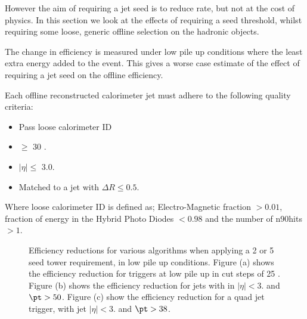 However the aim of requiring a jet seed is to reduce rate, but not at the cost 
of physics. In this section we look at the effects of requiring a seed 
threshold, whilst requiring some loose, generic offline selection on the 
hadronic objects.

The change in efficiency is measured under low pile up conditions where the 
least extra energy added to the event. This gives a worse case estimate of the 
effect of requiring a jet seed on the offline efficiency.

Each offline reconstructed calorimeter jet must adhere to the following quality 
criteria:
\begin{itemize}
\item Pass loose calorimeter ID 
\item \PT $\geq$ 30 \GeV.
\item $|\eta| \leq$ 3.0.
\item Matched to a \Lone jet with $\Delta R \leq 0.5$.
\end{itemize}
Where loose calorimeter ID is defined as; Electro-Magnetic fraction $> 0.01$, 
fraction of energy in the Hybrid Photo Diodes $< 
0.98$ and the number of n90hits $> 1$.

\begin{figure}[h!]
    \centering
     \newline
    \caption{Efficiency reductions for various \Lone algorithms when applying a 
    2 or 5 \GeV seed tower requirement, in low pile up 
    conditions. Figure (a) shows the efficiency reduction for \HT triggers at 
    low pile up in cut steps of 25 \GeV. Figure (b) 
    shows the efficiency reduction for jets with in $|\eta| <3.$ and $\pt > 
    50$\GeV. Figure (c) show the efficiency reduction for a quad jet trigger, 
    with jet $|\eta| <3.$ and $\pt > 38$\GeV.}
    \label{fig:lowpuratereductionRECO}
\end{figure}



